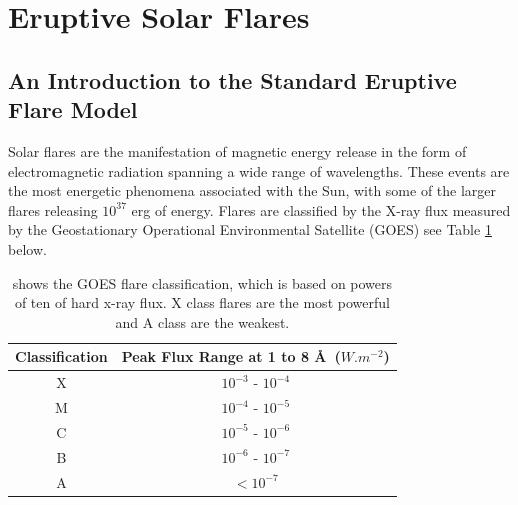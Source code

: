 \section{Eruptive Solar Flares}
\subsection{An Introduction to the Standard Eruptive Flare Model} 

Solar flares are the manifestation of magnetic energy release in the form of electromagnetic radiation spanning a wide range of wavelengths. These events are the most energetic phenomena associated with the Sun, with some of the larger flares releasing $10^{37}$ erg of energy. Flares are classified by the X-ray flux measured by the Geostationary Operational Environmental Satellite (GOES) see Table \ref{goes} below. \\

\begin{table}[h]
\centering
\begin{tabular}{|c|c|}\label{GOES}
Classification & Peak Flux Range at 1 to 8 \AA\ ($W.m^{-2}$)\\ 
\hline
X & $10^{-3}$ - $10^{-4}$\\ 
M & $10^{-4}$ - $10^{-5}$\\ 
C & $10^{-5}$ - $10^{-6}$\\ 
B & $10^{-6}$ - $10^{-7}$\\ 
A & $<10^{-7}$\\  
\end{tabular}
\caption{shows the GOES flare classification, which is based on powers of ten of hard x-ray flux. X class flares are the most powerful and A class are the weakest.}\label{goes}
\end{table}

